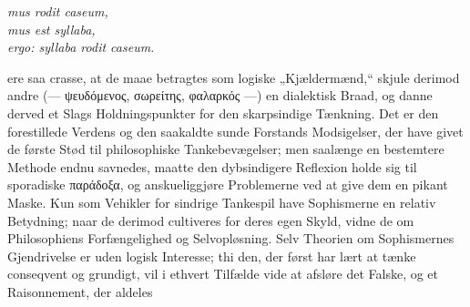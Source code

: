 \documentclass[12pt]{book}
\begin{document}
\begin{center}
\textit{mus rodit caseum,}\\
\textit{mus est syllaba,}\\
\textit{ergo: syllaba rodit caseum.}
\end{center}

\noindent ere saa crasse, at de maae betragtes som logiske „Kjældermænd,“ skjule
derimod andre (--- ψευδόμενος, σωρείτης, φαλαρκός ---) en dialektisk Braad, og danne
derved et Slags Holdningspunkter for den skarpsindige Tænkning. Det er den
forestillede Verdens og den saakaldte sunde Forstands Modsigelser, der have givet de
første Stød til philosophiske Tankebevægelser; men saalænge en bestemtere Methode
endnu savnedes, maatte den dybsindigere Reflexion holde sig til sporadiske
παράδοξα, og anskueliggjøre Problemerne ved at give dem en pikant Maske. Kun som
Vehikler for sindrige Tankespil have Sophismerne en relativ Betydning; naar de
derimod cultiveres for deres egen Skyld, vidne de om Philosophiens Forfængelighed
og Selvopløsning. Selv Theorien om Sophismernes Gjendrivelse er uden logisk
Interesse; thi den, der først har lært at tænke conseqvent og grundigt, vil i
ethvert Tilfælde vide at afsløre det Falske, og et Raisonnement, der aldeles
\end{document}
